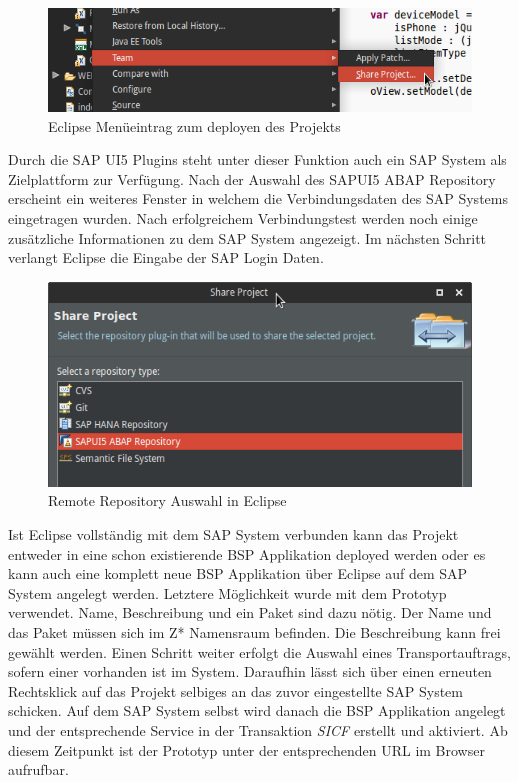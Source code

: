 \vspace{1em}
\begin{figure}[htb]
  \centering
  \includegraphics[width=0.8\linewidth]{abb/eclipse_share_project}
  \caption[Eclipse Menüeintrag zum deployen des Projekts]{Eclipse Menüeintrag zum deployen des Projekts}
  \label{fig:eclipseshare}
\end{figure}

Durch die SAP UI5 Plugins steht unter dieser Funktion auch ein SAP System als Zielplattform zur Verfügung. Nach der Auswahl des SAPUI5 ABAP Repository erscheint ein weiteres Fenster in welchem die Verbindungsdaten des SAP Systems eingetragen wurden. Nach erfolgreichem Verbindungstest werden noch einige zusätzliche Informationen zu dem SAP System angezeigt. Im nächsten Schritt verlangt Eclipse die Eingabe der SAP Login Daten.

\vspace{1em}
\begin{figure}[htb]
  \centering
  \includegraphics[width=0.8\linewidth]{abb/eclipse_share_project_window}
  \caption[Remote Repository Auswahl in Eclipse]{Remote Repository Auswahl in Eclipse}
  \label{fig:eclipsesharewindow}
\end{figure}

Ist Eclipse vollständig mit dem SAP System verbunden kann das Projekt entweder in eine schon existierende BSP Applikation deployed werden oder es kann auch eine komplett neue BSP Applikation über Eclipse auf dem SAP System angelegt werden. Letztere Möglichkeit wurde mit dem Prototyp verwendet. Name, Beschreibung und ein Paket sind dazu nötig. Der Name und das Paket müssen sich im Z* Namensraum befinden. Die Beschreibung kann frei gewählt werden. Einen Schritt weiter erfolgt die Auswahl eines Transportauftrags, sofern einer vorhanden ist im System. Daraufhin lässt sich über einen erneuten Rechtsklick auf das Projekt selbiges an das zuvor eingestellte SAP System schicken. Auf dem SAP System selbst wird danach die BSP Applikation angelegt und der entsprechende Service in der Transaktion \textit{SICF} erstellt und aktiviert. Ab diesem Zeitpunkt ist der Prototyp unter der entsprechenden URL im Browser aufrufbar.